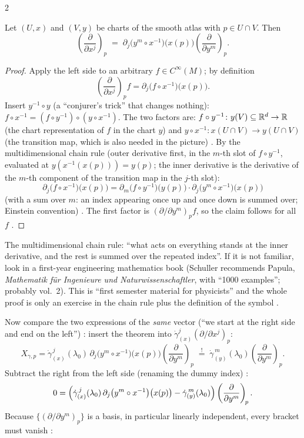 \begin{paracol}{2}
\begin{theorem}\label{thm:ts-basis-trafo}
Let $(U,x)$ and $(V,y)$ be charts of the smooth atlas with $p\in U\cap V$. Then
\[
  \left(\frac{\partial}{\partial x^j}\right)_{\!p}
  \;=\;\partial_j\bigl(y^m\circ x^{-1}\bigr)\bigl(x(p)\bigr)\left(\frac{\partial}{\partial y^m}\right)_{\!p}.
\]
\end{theorem}
\begin{proof}
Apply the left side to an arbitrary $f\in C^\infty(M)$; by definition
\[
  \left(\frac{\partial}{\partial x^j}\right)_{\!p}f=\partial_j\bigl(f\circ x^{-1}\bigr)\bigl(x(p)\bigr).
\]
Insert $y^{-1}\circ y$ (a ``conjurer's trick'' that changes nothing): $f\circ x^{-1}=(f\circ y^{-1})\circ(y\circ x^{-1})$.
The two factors are: $f\circ y^{-1}\colon y(V)\subseteq\mathbb{R}^d\to\mathbb{R}$ (the chart representation of $f$ in the chart $y$) and
$y\circ x^{-1}\colon x(U\cap V)\to y(U\cap V)$ (the transition map, which is also needed in the picture)
.
By the multidimensional chain rule (outer derivative first, in the $m$-th slot of $f\circ y^{-1}$, evaluated at
$y(x^{-1}(x(p)))=y(p)$; the inner derivative is the derivative of the $m$-th component of the transition map in the $j$-th
slot):
\[
  \partial_j\bigl(f\circ x^{-1}\bigr)\bigl(x(p)\bigr)
  =\partial_m\bigl(f\circ y^{-1}\bigr)\bigl(y(p)\bigr)\cdot\partial_j\bigl(y^m\circ x^{-1}\bigr)\bigl(x(p)\bigr)
\]
(with a sum over $m$: an index appearing once up and once down is summed over; Einstein convention)
.
The first factor is $(\partial/\partial y^m)_pf$, so the claim follows for all $f$ .
\end{proof}
\begin{aside}
The multidimensional chain rule: ``what acts on everything stands at the inner derivative, and the rest is summed over the
repeated index''. If it is not familiar, look in a first-year engineering mathematics book (Schuller recommends
Papula, \emph{Mathematik für Ingenieure und Naturwissenschaftler}, with ``1000 examples''; probably vol.~2). This is ``first
semester material for physicists'' and the whole proof is only an exercise in the chain rule plus the definition of the
symbol .
\end{aside}

Now compare the two expressions of the \emph{same} vector (``we start at the right side and end on the left'')
: insert the theorem into
$\dot\gamma^j_{(x)}(\partial/\partial x^j)_p$:
\[
  X_{\gamma,p}=\dot\gamma^{\,j}_{(x)}(\lambda_0)\,\partial_j\bigl(y^m\circ x^{-1}\bigr)\bigl(x(p)\bigr)\left(\frac{\partial}{\partial y^m}\right)_{\!p}
  \;\overset{!}{=}\;\dot\gamma^{\,m}_{(y)}(\lambda_0)\left(\frac{\partial}{\partial y^m}\right)_{\!p}.
\]
Subtract the right from the left side (renaming the dummy index) :
\[
  0=\Bigl(\dot\gamma^{\,j}_{(x)}(\lambda_0)\,\partial_j\bigl(y^m\circ x^{-1}\bigr)\bigl(x(p)\bigr)-\dot\gamma^{\,m}_{(y)}(\lambda_0)\Bigr)\left(\frac{\partial}{\partial y^m}\right)_{\!p}.
\]
Because $\{(\partial/\partial y^m)_p\}$ is a basis, in particular linearly independent, every bracket must vanish
:


\end{paracol}
